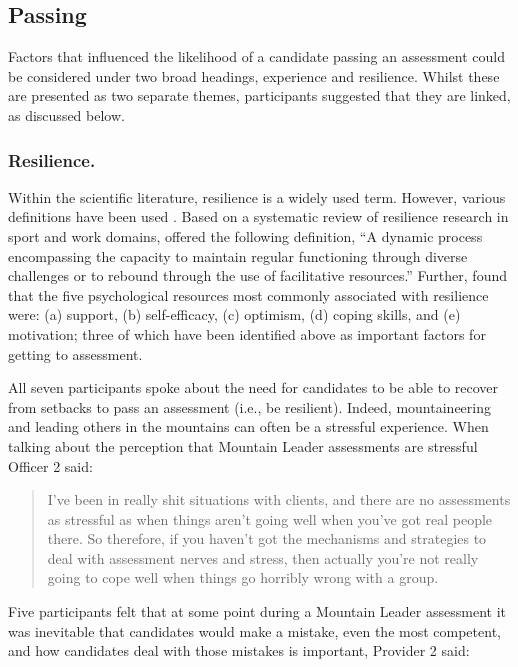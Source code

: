 \documentclass[
  12pt,
  a4paper,
]{book}
\begin{document}
\hypertarget{passing}{%
\subsection{Passing}\label{passing}}

Factors that influenced the likelihood of a candidate passing an assessment could be considered under two broad headings, experience and resilience. Whilst these are presented as two separate themes, participants suggested that they are linked, as discussed below.

\hypertarget{qual-passing-resilience}{%
\subsubsection{Resilience.}\label{qual-passing-resilience}}

Within the scientific literature, resilience is a widely used term. However, various definitions have been used \citep[cf.~][]{Fletcher2013}. Based on a systematic review of resilience research in sport and work domains, \citet{Bryan2017} offered the following definition, ``A dynamic process encompassing the capacity to maintain regular functioning through diverse challenges or to rebound through the use of facilitative resources.'' Further, \citet{Bryan2017} found that the five psychological resources most commonly associated with resilience were: (a) support, (b) self-efficacy, (c) optimism, (d) coping skills, and (e) motivation; three of which have been identified above as important factors for getting to assessment.

All seven participants spoke about the need for candidates to be able to recover from setbacks to pass an assessment (i.e., be resilient). Indeed, mountaineering and leading others in the mountains can often be a stressful experience. When talking about the perception that Mountain Leader assessments are stressful Officer 2 said:

\begin{quote}
I've been in really shit situations with clients, and there are no assessments as stressful as when things aren't going well when you've got real people there. So therefore, if you haven't got the mechanisms and strategies to deal with assessment nerves and stress, then actually you're not really going to cope well when things go horribly wrong with a group.
\end{quote}

Five participants felt that at some point during a Mountain Leader assessment it was inevitable that candidates would make a mistake, even the most competent, and how candidates deal with those mistakes is important, Provider 2 said:
\end{document}
